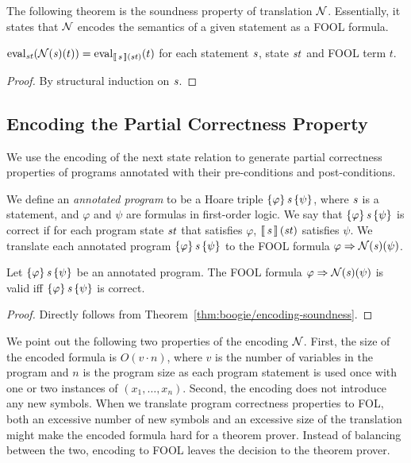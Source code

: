 The following theorem is the soundness property of translation $\mathcal{N}$. Essentially, it states that $\mathcal{N}$ encodes the semantics of a given statement as a FOOL formula.

\begin{theorem}\label{thm:boogie/encoding-soundness}
$\mathrm{eval}_{\mathit{st}}({\mathcal{N}({{\mathit{s}}})({t})}) = \mathrm{eval}_{\left\llbracket\,{\mathit{s}}\,\right\rrbracket(\mathit{st})}({t})$ for each statement $\mathit{s}$, state $\mathit{st}$ and FOOL term $t$. \QED
\end{theorem}
\begin{proof}
By structural induction on $\mathit{s}$. %
\end{proof}

\subsection{Encoding the Partial Correctness Property}\label{sec:boogie/next-state/translation}

We use the encoding of the next state relation to generate partial correctness properties of programs annotated with their pre-conditions and post-conditions. %

We define an \emph{annotated program} to be a Hoare triple $\{{\varphi}\}\,{\mathit{s}}\,\{{\psi}\}$, where $\mathit{s}$ is a statement, and $\varphi$ and $\psi$ are formulas in first-order logic. We say that $\{{\varphi}\}\,{\mathit{s}}\,\{{\psi}\}$ is correct if for each program state $\mathit{st}$ that satisfies $\varphi$, $\left\llbracket\,{\mathit{s}}\,\right\rrbracket(\mathit{st})$ satisfies $\psi$. We translate each annotated program $\{{\varphi}\}\,{\mathit{s}}\,\{{\psi}\}$ to the FOOL formula $\varphi \Rightarrow \mathcal{N}({{\mathit{s}}})({\psi})$.

\begin{theorem}\label{thm:boogie/translation-soundness}
Let $\{{\varphi}\}\,{\mathit{s}}\,\{{\psi}\}$ be an annotated program. The FOOL formula $\varphi \Rightarrow \mathcal{N}({{\mathit{s}}})({\psi})$ is valid iff $\{{\varphi}\}\,{\mathit{s}}\,\{{\psi}\}$ is correct. \QED
\end{theorem}
\begin{proof}
Directly follows from Theorem~\ref{thm:boogie/encoding-soundness}. %
\end{proof}

We point out the following two properties of the encoding $\mathcal{N}$. First, the size of the encoded formula is $O(v\cdot n)$, where $v$ is the number of variables in the program and $n$ is the program size as each program statement is used once with one or two instances of $(x_1,\ldots,x_n)$. Second, the encoding does not introduce any new symbols. When we translate program correctness properties to FOL, both an excessive number of new symbols and an excessive size of the translation might make the encoded formula hard for a theorem prover. Instead of balancing between the two, encoding to FOOL leaves the decision to the theorem prover.
